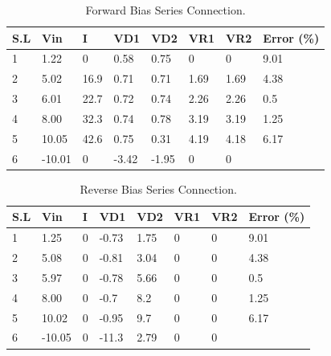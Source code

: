 \begin{table}[hbt!]
    \centering
    \caption{ Forward Bias Series Connection.}
    \label{tab1}


    \begin{tabular}{|l|l|l|l|l|l|l|l|}
        \hline
        S.L & Vin    & I    & VD1   & VD2   & VR1  & VR2  & Error (\%) \\ \hline
        1   & 1.22   & 0    & 0.58  & 0.75  & 0    & 0    & 9.01       \\ \hline
        2   & 5.02   & 16.9 & 0.71  & 0.71  & 1.69 & 1.69 & 4.38       \\ \hline
        3   & 6.01   & 22.7 & 0.72  & 0.74  & 2.26 & 2.26 & 0.5        \\ \hline
        4   & 8.00   & 32.3 & 0.74  & 0.78  & 3.19 & 3.19 & 1.25       \\ \hline
        5   & 10.05  & 42.6 & 0.75  & 0.31  & 4.19 & 4.18 & 6.17       \\ \hline
        6   & -10.01 & 0    & -3.42 & -1.95 & 0    & 0    &            \\ \hline
    \end{tabular}
\end{table}
\begin{table}[hbt!]
    \centering
    \caption{Reverse Bias Series Connection.}
    \label{tab2}
    \begin{tabular}{|l|l|l|l|l|l|l|l|}
        \hline
        S.L & Vin    & I & VD1   & VD2  & VR1 & VR2 & Error (\%) \\ \hline
        1   & 1.25   & 0 & -0.73 & 1.75 & 0   & 0   & 9.01       \\ \hline
        2   & 5.08   & 0 & -0.81 & 3.04 & 0   & 0   & 4.38       \\ \hline
        3   & 5.97   & 0 & -0.78 & 5.66 & 0   & 0   & 0.5        \\ \hline
        4   & 8.00   & 0 & -0.7  & 8.2  & 0   & 0   & 1.25       \\ \hline
        5   & 10.02  & 0 & -0.95 & 9.7  & 0   & 0   & 6.17       \\ \hline
        6   & -10.05 & 0 & -11.3 & 2.79 & 0   & 0   &            \\ \hline
    \end{tabular}
\end{table}

